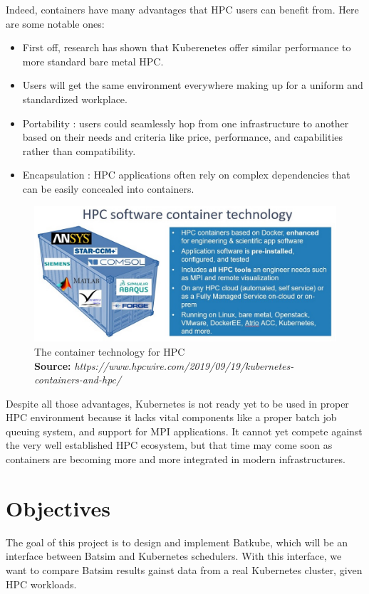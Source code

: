 \documentclass[12pt, a4paper]{memoir}
\newcommand*{\captionsource}[2]{%
    \caption[{#1}]{%
        #1%
        \\\hspace{\linewidth}%
	\textbf{Source:} \textit{#2}%
    }%
}
\begin{document}
Indeed, containers have many advantages that HPC users can benefit from. Here
are some notable ones:
\begin{itemize}
	\item First off, research has shown that Kuberenetes offer similar
		performance to more standard bare metal HPC\cite{8950981}.
	\item Users will get the same environment everywhere making up for a
		uniform and standardized workplace.
	\item Portability : users could seamlessly hop from one infrastructure
		to another based on their needs and criteria like price,
		performance, and capabilities rather than compatibility.
	\item Encapsulation : HPC applications often rely on complex
		dependencies that can be easily concealed into containers.
\end{itemize}
\begin{figure}[h]
	\centering
	\includegraphics[scale=0.5]{./imgs/hpc-container.jpg}
	\captionsource{The container technology for HPC}{https://www.hpcwire.com/2019/09/19/kubernetes-containers-and-hpc/}
	\label{fig:hpc-container}
\end{figure}

Despite all those advantages, Kubernetes is not ready yet to be used in proper
HPC environment because it lacks vital components like a proper batch job
queuing system, and support for MPI applications. It cannot yet compete against
the very well established HPC ecosystem, but that time may come soon as
containers are becoming more and more integrated in modern infrastructures.

\section{Objectives}

The goal of this project is to design and implement Batkube, which will be an
interface between Batsim and Kubernetes schedulers. With this interface, we
want to compare Batsim results gainst data from a real Kubernetes cluster,
given HPC workloads.
\end{document}
